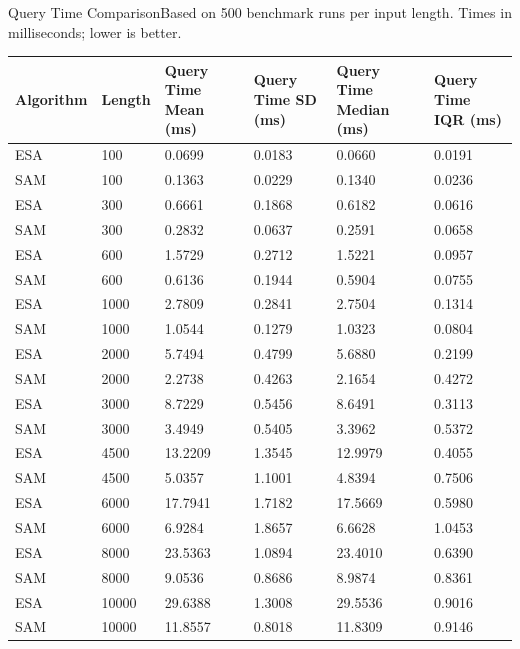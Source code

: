 \begin{benchmarktable}{Query Time Comparison}{Based on 500 benchmark runs per input length. Times in milliseconds; lower is better.}
\begin{tabularx}{\textwidth}{|X|X|X|X|X|X|}
\toprule
Algorithm & Length & Query Time Mean (ms) & Query Time SD (ms) & Query Time Median (ms) & Query Time IQR (ms) \\
\midrule
ESA & 100 & 0.0699 & 0.0183 & 0.0660 & 0.0191 \\
SAM & 100 & 0.1363 & 0.0229 & 0.1340 & 0.0236 \\
\hline
ESA & 300 & 0.6661 & 0.1868 & 0.6182 & 0.0616 \\
SAM & 300 & 0.2832 & 0.0637 & 0.2591 & 0.0658 \\
\hline
ESA & 600 & 1.5729 & 0.2712 & 1.5221 & 0.0957 \\
SAM & 600 & 0.6136 & 0.1944 & 0.5904 & 0.0755 \\
\hline
ESA & 1000 & 2.7809 & 0.2841 & 2.7504 & 0.1314 \\
SAM & 1000 & 1.0544 & 0.1279 & 1.0323 & 0.0804 \\
\hline
ESA & 2000 & 5.7494 & 0.4799 & 5.6880 & 0.2199 \\
SAM & 2000 & 2.2738 & 0.4263 & 2.1654 & 0.4272 \\
\hline
ESA & 3000 & 8.7229 & 0.5456 & 8.6491 & 0.3113 \\
SAM & 3000 & 3.4949 & 0.5405 & 3.3962 & 0.5372 \\
\hline
ESA & 4500 & 13.2209 & 1.3545 & 12.9979 & 0.4055 \\
SAM & 4500 & 5.0357 & 1.1001 & 4.8394 & 0.7506 \\
\hline
ESA & 6000 & 17.7941 & 1.7182 & 17.5669 & 0.5980 \\
SAM & 6000 & 6.9284 & 1.8657 & 6.6628 & 1.0453 \\
\hline
ESA & 8000 & 23.5363 & 1.0894 & 23.4010 & 0.6390 \\
SAM & 8000 & 9.0536 & 0.8686 & 8.9874 & 0.8361 \\
\hline
ESA & 10000 & 29.6388 & 1.3008 & 29.5536 & 0.9016 \\
SAM & 10000 & 11.8557 & 0.8018 & 11.8309 & 0.9146 \\
\bottomrule
\end{tabularx}
\end{benchmarktable}

